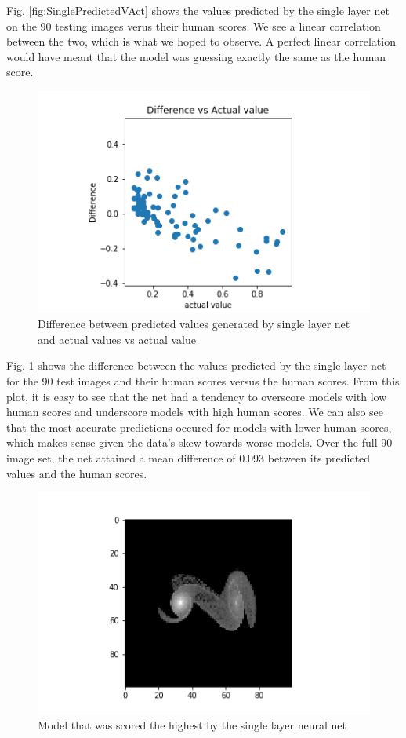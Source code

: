 \documentclass[conference]{IEEEtran}
\begin{document}
Fig. \ref{fig:SinglePredictedVAct} shows the values predicted by the single layer net on the 90 testing images verus their human scores. We see a linear correlation between the two, which is what we hoped to observe. A perfect linear correlation would have meant that the model was guessing exactly the same as the human score.

\begin{figure}[htbp]
\centerline{\includegraphics[width=0.75\linewidth]{./Images/SingleDiffVAct.png}}
\caption{Difference between predicted values generated by single layer net and actual values vs actual value}
\label{fig:SingleDiffVAct}
\end{figure}

Fig. \ref{fig:SingleDiffVAct} shows the difference between the values predicted by the single layer net for the 90 test images and their human scores versus the human scores. From this plot, it is easy to see that the net had a tendency to overscore models with low human scores and underscore models with high human scores. We can also see that the most accurate predictions occured for models with lower human scores, which makes sense given the data's skew towards worse models. Over the full 90 image set, the net attained a mean difference of 0.093 between its predicted values and the human scores.

\begin{figure}[htbp]
\centerline{\includegraphics[width=0.75\linewidth]{./Images/SinglePredictedBest.png}}
\caption{Model that was scored the highest by the single layer neural net}
\label{fig:SinglePredictedBest}
\end{figure}
\end{document}
